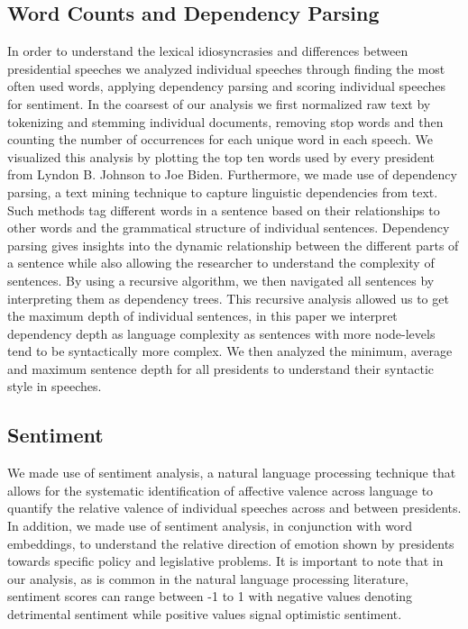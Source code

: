 \documentclass{article}
\begin{document}
{\subsection{Word Counts and Dependency Parsing }{In order to understand the lexical idiosyncrasies and differences between presidential speeches we analyzed individual speeches through finding the most often used words, applying dependency parsing and scoring individual speeches for sentiment. In the coarsest of our analysis we first normalized raw text by tokenizing and stemming individual documents, removing stop words and then counting the number of occurrences for each unique word in each speech. We visualized this analysis by plotting the top ten words used by every president from Lyndon B. Johnson to Joe Biden. Furthermore, we made use of dependency parsing, a text mining technique to capture linguistic dependencies from text. Such methods tag different words in a sentence based on their relationships to other words and the grammatical structure of individual sentences. Dependency parsing gives insights into the dynamic relationship between the different parts of a sentence while also allowing the researcher to understand the complexity of sentences. By using a recursive algorithm, we then navigated all sentences by interpreting them as dependency trees. This recursive analysis allowed us to get the maximum depth of individual sentences, in this paper we interpret dependency depth as language complexity as sentences with more node-levels tend to be syntactically more complex. We then analyzed the minimum, average and maximum sentence depth for all presidents to understand their syntactic style in speeches. }


\subsection{Sentiment}{We made use of sentiment analysis, a natural language processing technique that allows for the systematic identification of affective valence across language to quantify the relative valence of individual speeches across and between presidents.  In addition, we made use of sentiment analysis, in conjunction with word embeddings, to understand the relative direction of emotion shown by presidents towards specific policy and legislative problems. It is important to note that in our analysis, as is common in the natural language processing literature, sentiment scores can range between -1 to 1 with negative values denoting detrimental sentiment while positive values signal optimistic sentiment.}


}
\end{document}
